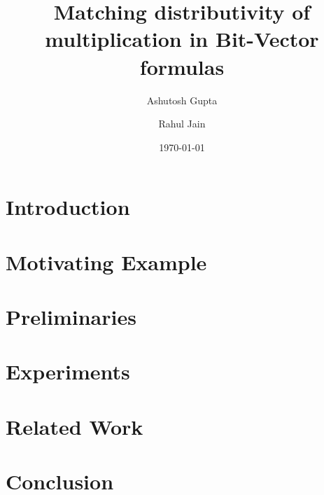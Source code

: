 \documentclass{llncs}
\begin{document}
\title{Matching distributivity of multiplication in Bit-Vector formulas}

\author{Ashutosh Gupta \and Rahul Jain}


\date{\today}

\maketitle
\begin{abstract}

\end{abstract}

\section{Introduction}
\label{sec:intro}


\section{Motivating Example}
\label{sec:motivating}


\section{Preliminaries}
\label{sec:prelim}


% 

\section{Experiments}
\label{sec:experiments}


\section{Related Work}
\label{sec:related}

\section{Conclusion}
\label{sec:conclusion}




\end{document}
